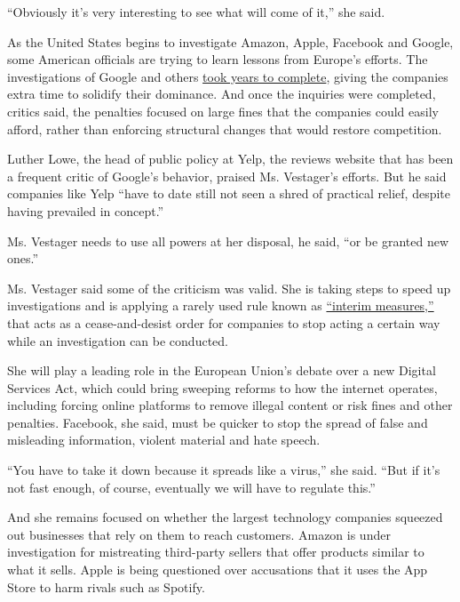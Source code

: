``Obviously it's very interesting to see what will come of it,'' she
said.

As the United States begins to investigate Amazon, Apple, Facebook and
Google, some American officials are trying to learn lessons from
Europe's efforts. The investigations of Google and others
\href{https://www.nytimes.com/2019/11/11/business/europe-technology-antitrust-regulation.html}{took
years to complete}, giving the companies extra time to solidify their
dominance. And once the inquiries were completed, critics said, the
penalties focused on large fines that the companies could easily afford,
rather than enforcing structural changes that would restore competition.

Luther Lowe, the head of public policy at Yelp, the reviews website that
has been a frequent critic of Google's behavior, praised Ms. Vestager's
efforts. But he said companies like Yelp ``have to date still not seen a
shred of practical relief, despite having prevailed in concept.''

Ms. Vestager needs to use all powers at her disposal, he said, ``or be
granted new ones.''

Ms. Vestager said some of the criticism was valid. She is taking steps
to speed up investigations and is applying a rarely used rule known as
\href{https://www.nytimes.com/2019/10/16/business/-big-tech-europe-antitrust.html}{``interim
measures,''} that acts as a cease-and-desist order for companies to stop
acting a certain way while an investigation can be conducted.

She will play a leading role in the European Union's debate over a new
Digital Services Act, which could bring sweeping reforms to how the
internet operates, including forcing online platforms to remove illegal
content or risk fines and other penalties. Facebook, she said, must be
quicker to stop the spread of false and misleading information, violent
material and hate speech.

``You have to take it down because it spreads like a virus,'' she said.
``But if it's not fast enough, of course, eventually we will have to
regulate this.''

And she remains focused on whether the largest technology companies
squeezed out businesses that rely on them to reach customers. Amazon is
under investigation for mistreating third-party sellers that offer
products similar to what it sells. Apple is being questioned over
accusations that it uses the App Store to harm rivals such as Spotify.

